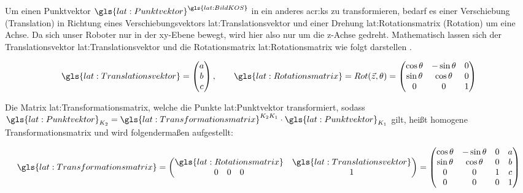 Um einen Punktvektor \( \gls{lat:Punktvektor}^{\gls{lat:BildKOS}} \) in ein anderes \gls{acr:ks} zu transformieren, bedarf es einer Verschiebung (Translation) in Richtung eines Verschiebungsvektors \gls{lat:Translationsvektor} und einer Drehung \gls{lat:Rotationsmatrix} (Rotation) um eine Achse. Da sich unser Roboter nur in der xy-Ebene bewegt, wird hier also nur um die z-Achse gedreht.  
Mathematisch lassen sich der Translationsvektor \gls{lat:Translationsvektor} und die Rotationsmatrix \gls{lat:Rotationsmatrix} wie folgt darstellen \autocite{bajdRobotics2010}.

\begin{equation}
\gls{lat:Translationsvektor} = 
\begin{pmatrix}
a 	\\
b 	\\
c    	\\
\end{pmatrix}
, \qquad
\gls{lat:Rotationsmatrix} = Rot(\vec{z},\theta) = 
\begin{pmatrix}
\cos{\theta} & -\sin{\theta} & {0} 	\\
\sin{\theta} & \cos{\theta} & {0} 	\\
{0} & {0} & {1} 				    	\\
\end{pmatrix}
\end{equation} 		

Die Matrix \gls{lat:Transformationsmatrix}, welche die Punkte \gls{lat:Punktvektor} transformiert, sodass 
\( \gls{lat:Punktvektor}_{K_2} = \gls{lat:Transformationsmatrix}^{K_2K_1} \cdot  \gls{lat:Punktvektor}_{K_1}	\) gilt, heißt homogene Transformationsmatrix und wird folgendermaßen aufgestellt:

\begin{equation}
\gls{lat:Transformationsmatrix} = 
\begin{pmatrix}
\gls{lat:Rotationsmatrix} &  \gls{lat:Translationsvektor}	\\
0 \quad 0 \quad 0 & 1 	\\
\end{pmatrix}
=
\begin{pmatrix}
\cos{\theta} & -\sin{\theta} & {0} & a 	\\
\sin{\theta} & \cos{\theta} & {0} & b 	\\
{0} & {0} & {1} & c 				    	\\
0 & 0 & 0 & 1 						\\
\end{pmatrix}
\end{equation}

